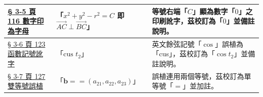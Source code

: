 \documentclass[a4paper,12pt,twoside]{article}
\begin{document}
\begin{table}[H]
\begin{tabularx}{\textwidth}{|p{3.0cm}|p{3.8cm}|X|}
\hyperref[note:b3s-ch3-p116-ac-bc-zero]{§ 3-5 頁 116 數字印為字母} & 
「$x^2+y^2-r^2 = C$ 即 $\vec{AC}\perp\vec{BC}$」 & 
等號右端「$C$」顯為數字「$0$」之印刷訛字，茲校訂為「$0$」並備註說明。 \\ \hline

\hyperref[note:b3s-ch3-p123-cust2-typo]{§ 3-6 頁 123 函數記號訛字} & 
「$\text{cus } t_2$」 & 
英文餘弦記號「$\cos$」誤植為「cus」，茲校訂為「$\cos t_2$」並備註說明。 \\ \hline

\hyperref[note:b3s-ch3-p127-double-eq]{§ 3-7 頁 127 雙等號誤植} & 
「$\mathbf{b} == (a_{21}, a_{22}, a_{23})$」 & 
誤植連用兩個等號，茲校訂為單等號「$=$」並加註。 \\ \hline

\end{tabularx}
\end{table}
\end{document}
